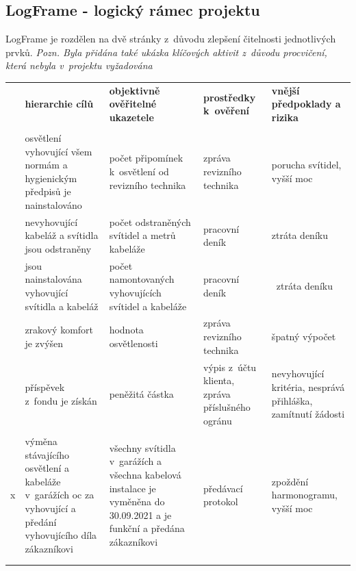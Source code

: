 \documentclass[a4paper, twoside, 11pt]{article}
\begin{document}
	\subsection{LogFrame - logický rámec projektu}
			LogFrame je rozdělen na dvě stránky z~důvodu zlepšení čitelnosti jednotlivých prvků. \textit{Pozn. Byla přidána také ukázka klíčových aktivit z~důvodu procvičení, která nebyla v~projektu vyžadována}
	\begin{table}[H]
		\resizebox{1 \textwidth}{!}
		{
		\begin{tabular}{ !{\vrule width 2pt} p{5cm} | p{5cm} | p{5cm} | p{5cm} | p{5cm} !{\vrule width 2pt} }
	 & \textbf{hierarchie cílů} & \textbf{objektivně ověřitelné ukazetele} & \textbf{prostředky k~ověření} & \textbf{vnější předpoklady a rizika}  \\ 
	    \\ 
	 & osvětlení vyhovující všem normám a hygienickým předpisů je nainstalováno & počet připomínek k~osvětlení od revizního technika & zpráva revizního technika & porucha svítidel, vyšší moc\   \\ \hline
	 & nevyhovující kabeláž a svítidla jsou odstraněny & počet odstraněných svítidel a metrů kabeláže & pracovní deník & ztráta deníku\   \\ \hline
	 & jsou nainstalována vyhovující svítidla a kabeláž & počet namontovaných vyhovujících svítidel a kabeláže  & pracovní deník & \ ztráta deníku
   \\ \hline
	 & zrakový komfort je zvýšen & hodnota osvětlenosti
  & zpráva revizního technika & špatný výpočet \\ \hline
	 & příspěvek z~fondu je získán & peněžitá částka & výpis z~účtu klienta, zpráva příslušného ogránu & nevyhovující kritéria, nesprává přihláška, zamítnutí žádosti\\ 
	   \\ 
	x & výměna stávajícího osvětlení a kabeláže v~garážích oc za vyhovující a předání vyhovujícího díla zákazníkovi & všechny svítidla v~garážích a všechna kabelová instalace je vyměněna do 30.09.2021 a je funkční a předána zákazníkovi & předávací protokol & zpoždění harmonogramu, vyšší moc\\ 
	  \\ 

\end{tabular}}
\end{table}
\end{document}
